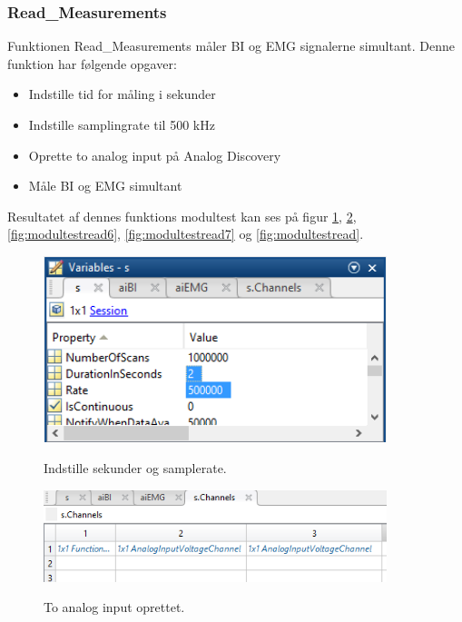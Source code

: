 \subsubsection{Read\_Measurements}
Funktionen Read\_Measurements måler BI og EMG signalerne simultant. Denne funktion har følgende opgaver:
\begin{itemize}
\item Indstille tid for måling i sekunder
\item Indstille samplingrate til 500 kHz
\item Oprette to analog input på Analog Discovery
\item Måle BI og EMG simultant
\end{itemize}

Resultatet af dennes funktions modultest kan ses på figur \ref{fig:modultestread3}, \ref{fig:modultestread2}, \ref{fig:modultestread6}, \ref{fig:modultestread7} og \ref{fig:modultestread}.


\begin{figure}[H] 
\centering
{\includegraphics[width=10cm]
{Figure/modultestread3}}
\caption{Indstille sekunder og samplerate.}
\label{fig:modultestread3}
\end{figure}


\begin{figure}[H] 
\centering
{\includegraphics[width=10cm]
{Figure/modultestread2}}
\caption{To analog input oprettet.}
\label{fig:modultestread2}
\end{figure}




